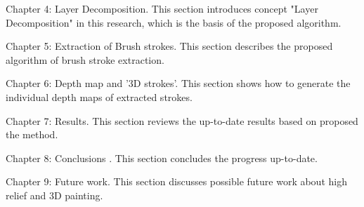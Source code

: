Chapter 4: Layer Decomposition. This section introduces concept "Layer Decomposition" in this research, which is the basis of the proposed algorithm.

Chapter 5: Extraction of Brush strokes. This section describes the proposed algorithm of brush stroke extraction.

Chapter 6: Depth map and '3D strokes'.  This section shows how to generate the individual depth maps of extracted strokes. 

Chapter 7: Results. This section reviews the up-to-date results based on proposed the method.

Chapter 8: Conclusions . This section concludes the progress up-to-date.

Chapter 9: Future work. This section discusses possible future work about high relief and 3D painting.
